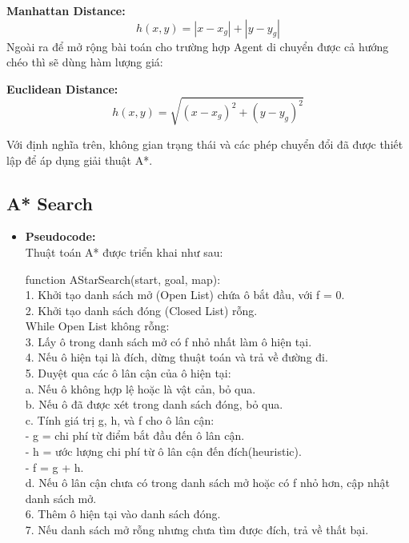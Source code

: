 \textbf{Manhattan Distance:} 
\[
h(x, y) = |x - x_g| + |y - y_g|
\] 
Ngoài ra để mở rộng bài toán cho trường hợp Agent di chuyển được cả hướng chéo thì sẽ dùng hàm lượng giá:

\textbf{Euclidean Distance:} 
\[
h(x, y) = \sqrt{(x - x_g)^2 + (y - y_g)^2}
\]


Với định nghĩa trên, không gian trạng thái và các phép chuyển đổi đã được thiết lập để áp dụng giải thuật A*.
 


\subsection{A*  Search}
\begin{itemize}
    \item \textbf{Pseudocode:}\\
    Thuật toán A* được triển khai như sau:

function AStarSearch(start, goal, map):\\
    1. Khởi tạo danh sách mở (Open List) chứa ô bắt đầu, với f = 0.\\
    2. Khởi tạo danh sách đóng (Closed List) rỗng.\\
    While Open List không rỗng:\\
        3. Lấy ô trong danh sách mở có f nhỏ nhất làm ô hiện tại.\\
        4. Nếu ô hiện tại là đích, dừng thuật toán và trả về đường đi.\\
        5. Duyệt qua các ô lân cận của ô hiện tại:\\
            a. Nếu ô không hợp lệ hoặc là vật cản, bỏ qua.\\
            b. Nếu ô đã được xét trong danh sách đóng, bỏ qua.\\
            c. Tính giá trị g, h, và f cho ô lân cận:\\
                - g = chi phí từ điểm bắt đầu đến ô lân cận.\\
                - h = ước lượng chi phí từ ô lân cận đến đích(heuristic).\\
                - f = g + h.\\
            d. Nếu ô lân cận chưa có trong danh sách mở hoặc có f nhỏ hơn, cập nhật danh sách mở.\\
        6. Thêm ô hiện tại vào danh sách đóng.\\
    7. Nếu danh sách mở rỗng nhưng chưa tìm được đích, trả về thất bại.\\





\end{itemize}
